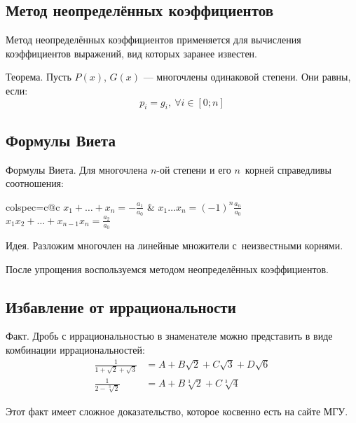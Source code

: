 \subsection{Метод неопределённых коэффициентов}

{\bold Метод неопределённых коэффициентов} применяется для вычисления коэффициентов выражений, вид которых {\ital заранее известен}.

\begin{theorem}
{\bold Теорема.} Пусть $P(x)$, $G(x)$ --- многочлены одинаковой степени. Они {\ital равны}, если:
$$p_i=g_i,\ \forall i\in[0;n]$$ 
\end{theorem}

\subsection{Формулы Виета}

\begin{theorem}
{\bold Формулы Виета.} Для многочлена $n$-ой степени и его $n$~корней справедливы соотношения:

{\centering\begin{tblr}{colspec={c@{\qquad}c}}
$\displaystyle x_1+\dots+x_n=-\frac{a_1}{a_0}$ & $\displaystyle x_1\dots x_n=(-1)^{n}\frac{a_n}{a_0}$\\
$\displaystyle x_1x_2+\dots+x_{n-1}x_n=\frac{a_2}{a_0}$\\
\end{tblr}\par}
\end{theorem}

{\bold Идея.} Разложим многочлен на {\ital линейные множители} с~неизвестными корнями.

После упрощения воспользуемся {\ital методом неопределённых коэффициентов}.

\subsection{Избавление от иррациональности}

\begin{theorem}
{\bold Факт.} Дробь с иррациональностью в знаменателе можно представить в виде {\ital комбинации} иррациональностей:
$$\begin{aligned}\frac{1}{1+\sqrt{2}+\sqrt{3}}&=A+B\sqrt{2}+C\sqrt{3}+D\sqrt{6}\\
\frac{1}{2-\sqrt[3]{2}}&=A+B\sqrt[3]{2}+C\sqrt[3]{4}
\end{aligned}$$
\end{theorem}
Этот факт имеет сложное доказательство, которое косвенно есть на сайте МГУ. 
